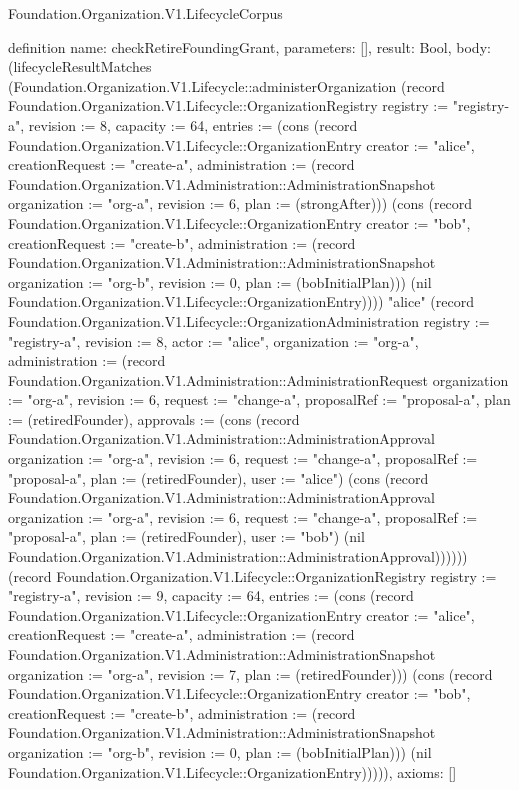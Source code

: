 \begin{lexlean}{Foundation.Organization.V1.LifecycleCorpus}
\begin{semanticmodule}
definition{
  name: checkRetireFoundingGrant,
  parameters: [],
  result: Bool,
  body: (lifecycleResultMatches (Foundation.Organization.V1.Lifecycle::administerOrganization (record Foundation.Organization.V1.Lifecycle::OrganizationRegistry {registry := "registry-a", revision := 8, capacity := 64, entries := (cons (record Foundation.Organization.V1.Lifecycle::OrganizationEntry {creator := "alice", creationRequest := "create-a", administration := (record Foundation.Organization.V1.Administration::AdministrationSnapshot {organization := "org-a", revision := 6, plan := (strongAfter)})}) (cons (record Foundation.Organization.V1.Lifecycle::OrganizationEntry {creator := "bob", creationRequest := "create-b", administration := (record Foundation.Organization.V1.Administration::AdministrationSnapshot {organization := "org-b", revision := 0, plan := (bobInitialPlan)})}) (nil Foundation.Organization.V1.Lifecycle::OrganizationEntry)))}) "alice" (record Foundation.Organization.V1.Lifecycle::OrganizationAdministration {registry := "registry-a", revision := 8, actor := "alice", organization := "org-a", administration := (record Foundation.Organization.V1.Administration::AdministrationRequest {organization := "org-a", revision := 6, request := "change-a", proposalRef := "proposal-a", plan := (retiredFounder), approvals := (cons (record Foundation.Organization.V1.Administration::AdministrationApproval {organization := "org-a", revision := 6, request := "change-a", proposalRef := "proposal-a", plan := (retiredFounder), user := "alice"}) (cons (record Foundation.Organization.V1.Administration::AdministrationApproval {organization := "org-a", revision := 6, request := "change-a", proposalRef := "proposal-a", plan := (retiredFounder), user := "bob"}) (nil Foundation.Organization.V1.Administration::AdministrationApproval)))})})) (record Foundation.Organization.V1.Lifecycle::OrganizationRegistry {registry := "registry-a", revision := 9, capacity := 64, entries := (cons (record Foundation.Organization.V1.Lifecycle::OrganizationEntry {creator := "alice", creationRequest := "create-a", administration := (record Foundation.Organization.V1.Administration::AdministrationSnapshot {organization := "org-a", revision := 7, plan := (retiredFounder)})}) (cons (record Foundation.Organization.V1.Lifecycle::OrganizationEntry {creator := "bob", creationRequest := "create-b", administration := (record Foundation.Organization.V1.Administration::AdministrationSnapshot {organization := "org-b", revision := 0, plan := (bobInitialPlan)})}) (nil Foundation.Organization.V1.Lifecycle::OrganizationEntry)))})),
  axioms: []
}


\end{semanticmodule}
\end{lexlean}
